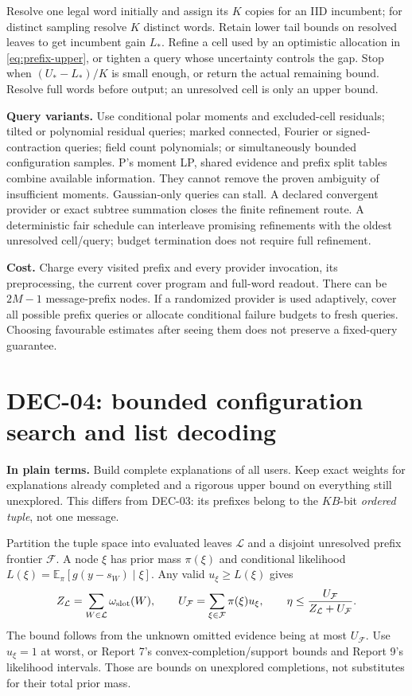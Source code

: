 \documentclass[10pt,a4paper]{article}
\newcommand{\E}{\mathbb E}
\begin{document}
Resolve one legal word initially and assign its $K$ copies for an IID incumbent; for distinct sampling
resolve $K$ distinct words. Retain lower tail bounds on resolved leaves to get incumbent gain $L_*$.
Refine a cell used by an optimistic allocation in \eqref{eq:prefix-upper}, or tighten a query whose
uncertainty controls the gap. Stop when $(U_*-L_*)/K$ is small enough, or return the actual remaining bound.
Resolve full words before output; an unresolved cell is only an upper bound.

\textbf{Query variants.} Use conditional polar moments and excluded-cell residuals; tilted or polynomial
residual queries; marked connected, Fourier or signed-contraction queries; field count polynomials;
or simultaneously bounded configuration samples. P's moment LP, shared evidence and prefix split tables
combine available information. They cannot remove the proven ambiguity of insufficient moments.
Gaussian-only queries can stall. A declared convergent provider or exact subtree summation closes
the finite refinement route. A deterministic fair schedule can interleave promising refinements with
the oldest unresolved cell/query; budget termination does not require full refinement.

\textbf{Cost.} Charge every visited prefix and every provider invocation, its preprocessing, the current
cover program and full-word readout. There can be $2M-1$ message-prefix nodes. If a randomized provider
is used adaptively, cover all possible prefix queries or allocate conditional failure budgets to fresh
queries. Choosing favourable estimates after seeing them does not preserve a fixed-query guarantee.

\clearpage
\section{DEC-04: bounded configuration search and list decoding}
\label{sec:configuration}
\textbf{In plain terms.} Build complete explanations of all users. Keep exact weights for explanations
already completed and a rigorous upper bound on everything still unexplored.
This differs from DEC-03: its prefixes belong to the $KB$-bit \emph{ordered tuple}, not one message.

Partition the tuple space into evaluated leaves $\mathcal L$ and a disjoint unresolved prefix frontier
$\mathcal F$. A node $\xi$ has prior mass $\pi(\xi)$ and conditional likelihood
$L(\xi)=\E_\pi[g(y-s_W)\mid\xi]$. Any valid $u_\xi\geq L(\xi)$ gives
\[
 Z_{\mathcal L}=\sum_{W\in\mathcal L}\omega_{\rm slot}(W),\qquad
 U_{\mathcal F}=\sum_{\xi\in\mathcal F}\pi(\xi)u_\xi,\qquad
 \eta\leq\frac{U_{\mathcal F}}{Z_{\mathcal L}+U_{\mathcal F}}.
\]
The bound follows from the unknown omitted evidence being at most $U_{\mathcal F}$.
Use $u_\xi=1$ at worst, or Report 7's convex-completion/support bounds and Report 9's likelihood
intervals. Those are bounds on unexplored completions, not substitutes for their total prior mass.
\end{document}
